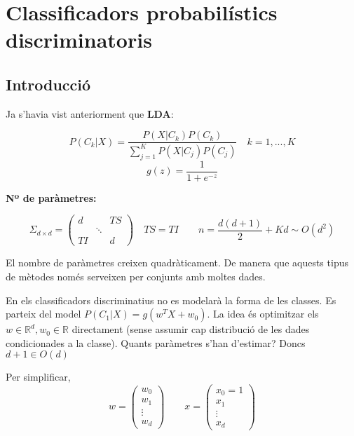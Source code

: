 \chapter{Classificadors probabilístics discriminatoris}
\section{Introducció}
Ja s'havia vist anteriorment que \textbf{LDA}:

$$
P(C_k|X) = \frac{P(X|C_k)P(C_k)}{\sum_{j=1}^K P(X|C_j)P(C_j)}\quad k=1,...,K
$$
$$
g(z) = \frac{1}{1 + e^{-z}}
$$

\textbf{Nº de paràmetres:}

$$
\Sigma_{d\times d} =
\begin{pmatrix}
d & & TS \\
& \ddots & \\
TI & & d
\end{pmatrix} \quad TS = TI \qquad 
\boxed{n = \frac{d(d+1)}{2} + Kd \sim O(d^2)}
$$

El nombre de paràmetres creixen quadràticament. De manera que aquests tipus de mètodes només serveixen per conjunts amb moltes dades.

En els classificadors discriminatius no es modelarà la forma de les classes. Es parteix del model $P(C_1|X) = g(w^T X + w_0)$. La idea és optimitzar els $w \in \mathbb{R}^d,w_0 \in \mathbb{R}$ directament (sense assumir cap distribució de les dades condicionades a la classe). Quants paràmetres s'han d'estimar? Doncs $d + 1 \in O(d)$ 

Per simplificar,
$$
w = \begin{pmatrix}
w_0 \\
w_1 \\
\vdots\\
w_d
\end{pmatrix}
\qquad
x = 
\begin{pmatrix}
x_0 = 1\\
x_1\\
\vdots\\
x_d
\end{pmatrix}
$$

